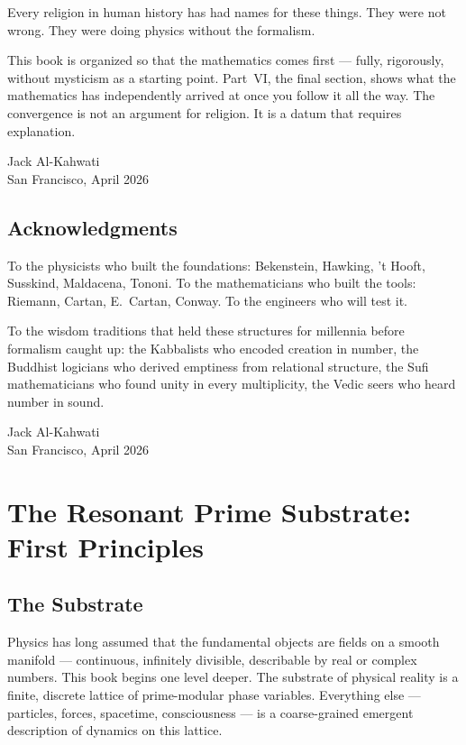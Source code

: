 \documentclass[12pt,oneside]{book}
\theoremstyle{definition}
\begin{document}
Every religion in human history has had names for these things. They were not wrong.
They were doing physics without the formalism.

This book is organized so that the mathematics comes first --- fully, rigorously,
without mysticism as a starting point. Part~VI, the final section, shows what
the mathematics has independently arrived at once you follow it all the way.
The convergence is not an argument for religion. It is a datum that requires
explanation.

\bigskip\noindent\hfill Jack Al-Kahwati\\\hfill San Francisco, April 2026

\chapter*{Acknowledgments}

To the physicists who built the foundations: Bekenstein, Hawking, 't Hooft,
Susskind, Maldacena, Tononi. To the mathematicians who built the tools: Riemann,
Cartan, E.~Cartan, Conway. To the engineers who will test it.

To the wisdom traditions that held these structures for millennia before formalism
caught up: the Kabbalists who encoded creation in number, the Buddhist logicians
who derived emptiness from relational structure, the Sufi mathematicians who found
unity in every multiplicity, the Vedic seers who heard number in sound.

\bigskip\noindent\hfill Jack Al-Kahwati\\\hfill San Francisco, April 2026

\mainmatter

\part{The Resonant Prime Substrate: First Principles}

\chapter{The Substrate}
\label{chap:substrate}

Physics has long assumed that the fundamental objects are fields on a smooth
manifold --- continuous, infinitely divisible, describable by real or complex
numbers. This book begins one level deeper. The substrate of physical reality is
a finite, discrete lattice of prime-modular phase variables. Everything else ---
particles, forces, spacetime, consciousness --- is a coarse-grained emergent
description of dynamics on this lattice.
\end{document}
